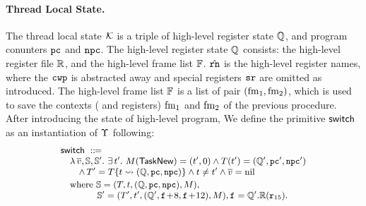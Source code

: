 \paragraph{\textbf{Thread Local State.}} 
The thread local state $\mathcal{K}$ 
is a triple of high-level register state $\mathbb{Q}$, 
and program conunters $\texttt{pc}$ and $\texttt{npc}$. The high-level 
register state $\mathbb{Q}$ consists: 
the high-level register file $\mathbb{R}$, 
and the high-level frame list $\mathbb{F}$. 
$\hat{\texttt{rn}}$ is the high-level register names, where 
the $\texttt{cwp}$ is abstracted away and special registers 
$\texttt{sr}$ are omitted as introduced.
The high-level frame list $\mathbb{F}$ is a list of pair 
$(\text{fm}_1, \text{fm}_2)$, which is used to save 
the contexts (\localRN{} and \inRN{} registers) 
$\text{fm}_1$ and $\text{fm}_2$ of the previous procedure.
After introducing the state of high-level program, 
We define the primitive $\mathsf{switch}$ as 
an instantiation of $\Upsilon$ following: 
\[
    \small
    \begin{array}{l}
        \primsw \ \define \\
        \quad 
        \lambda \, \args{\val}, \hpstate, \hpstate'. \ 
        \exists \, \thrdid'. \ 
        \Mem(\TaskNew) = (\thrdid', 0) \land 
        \thrdpool(\thrdid') = 
            (\hRstate', \pc', \npc') \\
        \qquad
        \land \,
        \thrdpool' = \thrdpool\{ \thrdid \rightsquigarrow 
            (\hRstate, \pc, \npc) \} 
            \land \tid \neq \tid' \land \args{\val} = \nil \\
        \\[-9pt]
        \quad \text{where} \ 
        \hpstate = 
            (\thrdpool, \thrdid, (\hRstate, \pc, \npc), \Mem), \\
        \qquad\qquad
        \hpstate' = 
            (\thrdpool', \thrdid', 
                (\hRstate', \lab{}\!+\!8, \lab{}\!+\!12), \Mem), 
                \lab{} = \hRstate'.\hRfile(\reg{15}). 
    \end{array}
\]

